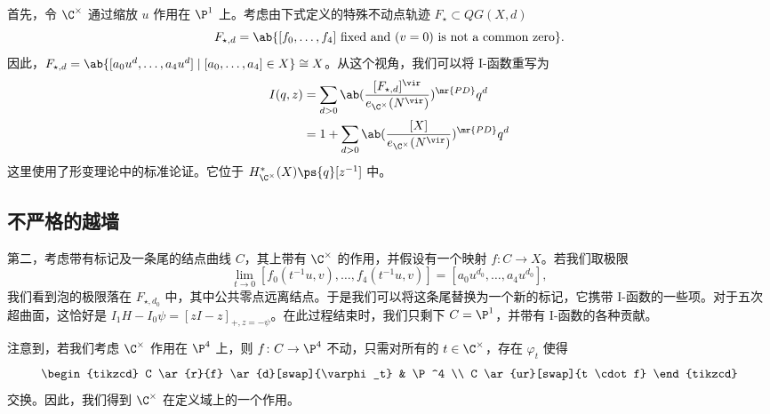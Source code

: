 首先，令 \(\C^{\times}\) 通过缩放 \(u\) 作用在 \(\P^1\) 上。考虑由下式定义的特殊不动点轨迹 \(F_{\star} \subset QG(X, d)\)
\[ F_{\star,d} = \ab\{ [f_0, \ldots, f_4] \text{ fixed and } (v=0) \text{ is not a common zero} \}. \]
因此，\(F_{\star,d} = \ab\{ [a_0 u^d, \ldots, a_4 u^d] \mid [a_0, \ldots, a_4] \in X \} \cong X\)。从这个视角，我们可以将 I-函数重写为
\begin{align*}
    I(q,z) &= \sum_{d > 0} \ab(\frac{[F_{\star, d}]^{\vir}}{e_{\C^{\times}}(N^{\vir})})^{\mr{PD}} q^d \\
    &= 1 + \sum_{d > 0} \ab( \frac{[X]}{e_{\C^{\times}}(N^{\vir})})^{\mr{PD}} q^d
\end{align*}
这里使用了形变理论中的标准论证。它位于 \(H^*_{\C^{\times}}(X) \ps{q}[z^{-1}]\) 中。

\subsection{不严格的越墙}%
\label{sub:Wall-crossing without rigor}


第二，考虑带有标记及一条尾的结点曲线 \(C\)，其上带有 \(\C^{\times}\) 的作用，并假设有一个映射 \(f \colon C \to X\)。若我们取极限
\[ \lim_{t \to 0} [f_0(t^{-1}u, v), \ldots, f_4(t^{-1}u, v)] = [a_0 u^{d_0}, \ldots, a_4 u^{d_0}], \]
我们看到泡的极限落在 \(F_{\star, d_0}\) 中，其中公共零点远离结点。于是我们可以将这条尾替换为一个新的标记，它携带 I-函数的一些项。对于五次超曲面，这恰好是 \(I_1 H - I_0 \psi = [zI-z]_{+, z = -\psi}\)。在此过程结束时，我们只剩下 \(C = \P^1\)，并带有 I-函数的各种贡献。

注意到，若我们考虑 \(\C^{\times}\) 作用在 \(\P^4\) 上，则 \(f \colon C \to \P^4\) 不动，只需对所有的 \(t \in \C^{\times}\)，存在 \(\varphi_t\) 使得
\begin{equation*}
\begin{tikzcd}
    C \ar{r}{f} \ar{d}[swap]{\varphi_t} & \P^4 \\
    C \ar{ur}[swap]{t \cdot f}
\end{tikzcd}
\end{equation*}
交换。因此，我们得到 \(\C^{\times}\) 在定义域上的一个作用。


